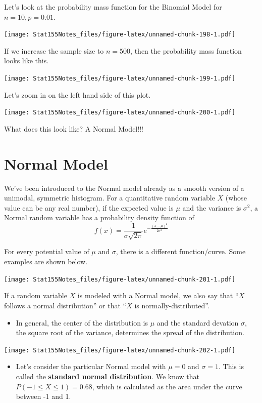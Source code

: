 \documentclass[]{book}
\providecommand{\tightlist}{%
  \setlength{\itemsep}{0pt}\setlength{\parskip}{0pt}}
\begin{document}
Let's look at the probability mass function for the Binomial Model for \(n = 10, p = 0.01\).

\texttt{[image: Stat155Notes\_files/figure-latex/unnamed-chunk-198-1.pdf]}

If we increase the sample size to \(n = 500\), then the probability mass function looks like this.

\texttt{[image: Stat155Notes\_files/figure-latex/unnamed-chunk-199-1.pdf]}

Let's zoom in on the left hand side of this plot.

\texttt{[image: Stat155Notes\_files/figure-latex/unnamed-chunk-200-1.pdf]}

What does this look like? A Normal Model!!!

\hypertarget{normal-model}{%
\section{Normal Model}\label{normal-model}}

We've been introduced to the Normal model already as a smooth version of a unimodal, symmetric histogram. For a quantitative random variable \(X\) (whose value can be any real number), if the expected value is \(\mu\) and the variance is \(\sigma^2\), a Normal random variable has a probability density function of
\[f(x) =  \frac{1}{\sigma\sqrt{2\pi}}e^{-\frac{(x-\mu)^2}{2\sigma^2}}\]

For every potential value of \(\mu\) and \(\sigma\), there is a different function/curve. Some examples are shown below.

\texttt{[image: Stat155Notes\_files/figure-latex/unnamed-chunk-201-1.pdf]}

If a random variable \(X\) is modeled with a Normal model, we also say that ``\(X\) follows a normal distribution'' or that ``\(X\) is normally-distributed''.

\begin{itemize}
\tightlist
\item
  In general, the center of the distribution is \(\mu\) and the standard devation \(\sigma\), the square root of the variance, determines the spread of the distribution.
\end{itemize}

\texttt{[image: Stat155Notes\_files/figure-latex/unnamed-chunk-202-1.pdf]}

\begin{itemize}
\tightlist
\item
  Let's consider the particular Normal model with \(\mu=0\) and \(\sigma=1\). This is called the \textbf{standard normal distribution}. We know that \(P(-1\leq X \leq 1) = 0.68\), which is calculated as the area under the curve between -1 and 1.
\end{itemize}
\end{document}
